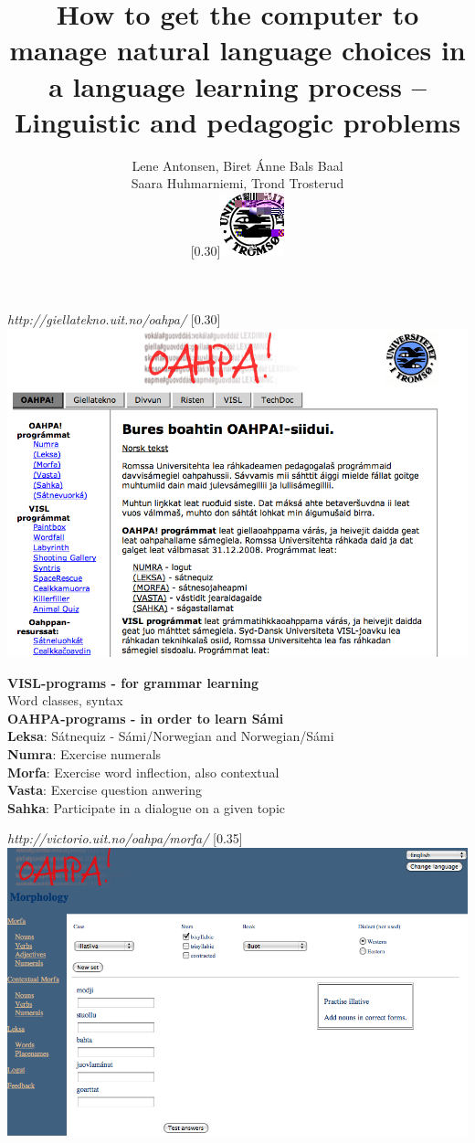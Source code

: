 \documentclass[landscape,norsk,11pt]{seminar}
\title{How to get the computer to manage natural language choices in a language learning process -- Linguistic and pedagogic problems}
\author{Lene Antonsen, Biret Ánne Bals Baal\\
Saara Huhmarniemi, Trond Trosterud \\
 \scalebox{0.30}[0.30]{\includegraphics{img/logoWeb070sh.jpg}}}
\begin{document}
\begin{slide}

\maketitle


\newslide
\textit{http://giellatekno.uit.no/oahpa/}
\scalebox{0.30}[0.30]{\includegraphics{img/gtoahpa.png}} 


\newslide
\textbf{VISL-programs - for grammar learning}\\
\newline
Word classes, syntax\\


\newslide
\textbf{OAHPA-programs - in order to learn Sámi}\\
\newline
\textbf{Leksa}: Sátnequiz - Sámi/Norwegian and Norwegian/Sámi\\
\textbf{Numra}: Exercise numerals\\
\textbf{Morfa}: Exercise word inflection, also contextual \\
\textbf{Vasta}: Exercise question anwering\\
\textbf{Sahka}: Participate in a dialogue on a given topic

\newslide
\textit{http://victorio.uit.no/oahpa/morfa/}
\scalebox{0.35}[0.35]{\includegraphics{img/oahpa.png}} 


\end{slide}
\end{document}
